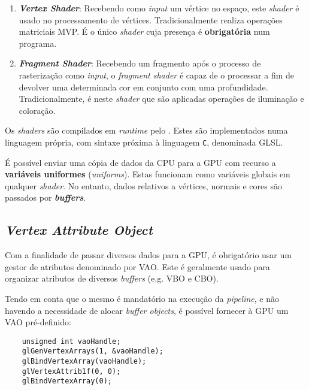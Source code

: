 \begin{enumerate}
    \item \textbf{\itshape Vertex Shader}:
    Recebendo como \textit{input} um vértice no espaço, este \textit{shader} é usado no processamento de vértices. Tradicionalmente realiza operações matriciais \ac{MVP}. É o único \textit{shader} cuja presença é \textbf{obrigatória} num programa.
    
    \item \textbf{\itshape Fragment Shader}:
    Recebendo um fragmento após o processo de rasterização como \textit{input}, o \textit{fragment shader} é capaz de o processar a fim de devolver uma determinada cor em conjunto com uma profundidade. Tradicionalmente, é neste \textit{shader} que são aplicadas operações de iluminação e coloração.
\end{enumerate}

Os \textit{shaders} são compilados em \textit{runtime} pelo \opengl. Estes são implementados numa linguagem própria, com sintaxe próxima à linguagem \verb|C|, denominada \acf{GLSL}.

É possível enviar uma cópia de dados da \ac{CPU} para a \ac{GPU} com recurso a \textbf{variáveis uniformes} (\textit{uniforms}). Estas funcionam como variáveis globais em qualquer \textit{shader}. No entanto, dados relativos a vértices, normais e cores são passados por \textbf{\textit{buffers}}.


\subsection{\textit{Vertex Attribute Object}}
\label{ssec::arte:opengl:vao}

Com a finalidade de passar diversos dados para a \ac{GPU}, é obrigatório usar um gestor de atributos denominado por \acf{VAO}. Este é geralmente usado para organizar atributos de diversos \textit{buffers} (e.g. \ac{VBO} e \ac{CBO}).

Tendo em conta que o mesmo é mandatório na execução da \textit{pipeline}, e não havendo a necessidade de alocar \textit{buffer objects}, é possível fornecer à \ac{GPU} um \ac{VAO} pré-definido:

\begin{verbatim}
    unsigned int vaoHandle;
    glGenVertexArrays(1, &vaoHandle);
    glBindVertexArray(vaoHandle);
    glVertexAttrib1f(0, 0);
    glBindVertexArray(0);
\end{verbatim}





